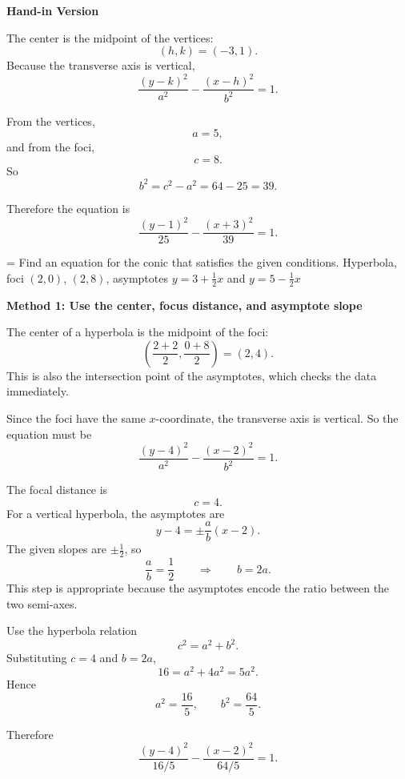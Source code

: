 \documentclass[a4paper,12pt,twocolumn]{article}
\newlength{\problemnumberwidth}
\newenvironment{solutionbox}{\begin{framed}}{\end{framed}}
\newcommand{\problem}[3]{%
  \Needspace{10\baselineskip}%
  \phantomsection\label{#1}%
  \par\vspace{0.8em}%
  \noindent
  \hangindent=\problemnumberwidth
  \hangafter=1
  \makebox[\problemnumberwidth][l]{\textbf{#2.}}#3\par
}
\begin{document}
\begin{solutionbox}
\textbf{Hand-in Version}

The center is the midpoint of the vertices:
\[
(h,k)=(-3,1).
\]
Because the transverse axis is vertical,
\[
\frac{(y-k)^2}{a^2}-\frac{(x-h)^2}{b^2}=1.
\]

From the vertices,
\[
a=5,
\]
and from the foci,
\[
c=8.
\]
So
\[
b^2=c^2-a^2=64-25=39.
\]

Therefore the equation is
\[
\boxed{\frac{(y-1)^2}{25}-\frac{(x+3)^2}{39}=1.}
\]
\end{solutionbox}

\problem{prob:10-5-50}{50}{Find an equation for the conic that satisfies the given conditions.
\medskip
\noindent Hyperbola, foci \((2,0)\), \((2,8)\), asymptotes \(y=3+\frac12x\) and \(y=5-\frac12x\)}

\begin{solutionbox}
\textbf{Method 1: Use the center, focus distance, and asymptote slope}

\begin{steps}
\item The center of a hyperbola is the midpoint of the foci:
\[
\left(\frac{2+2}{2},\frac{0+8}{2}\right)=(2,4).
\]
This is also the intersection point of the asymptotes, which checks the data immediately.

\item Since the foci have the same \(x\)-coordinate, the transverse axis is vertical. So the equation must be
\[
\frac{(y-4)^2}{a^2}-\frac{(x-2)^2}{b^2}=1.
\]

\item The focal distance is
\[
c=4.
\]
For a vertical hyperbola, the asymptotes are
\[
y-4=\pm\frac{a}{b}(x-2).
\]
The given slopes are \(\pm\frac12\), so
\[
\frac{a}{b}=\frac12
\qquad\Longrightarrow\qquad
b=2a.
\]
This step is appropriate because the asymptotes encode the ratio between the two semi-axes.

\item Use the hyperbola relation
\[
c^2=a^2+b^2.
\]
Substituting \(c=4\) and \(b=2a\),
\[
16=a^2+4a^2=5a^2.
\]
Hence
\[
a^2=\frac{16}{5},
\qquad
b^2=\frac{64}{5}.
\]

\item Therefore
\[
\boxed{\frac{(y-4)^2}{16/5}-\frac{(x-2)^2}{64/5}=1.}
\]
\end{steps}
\end{solutionbox}
\end{document}
